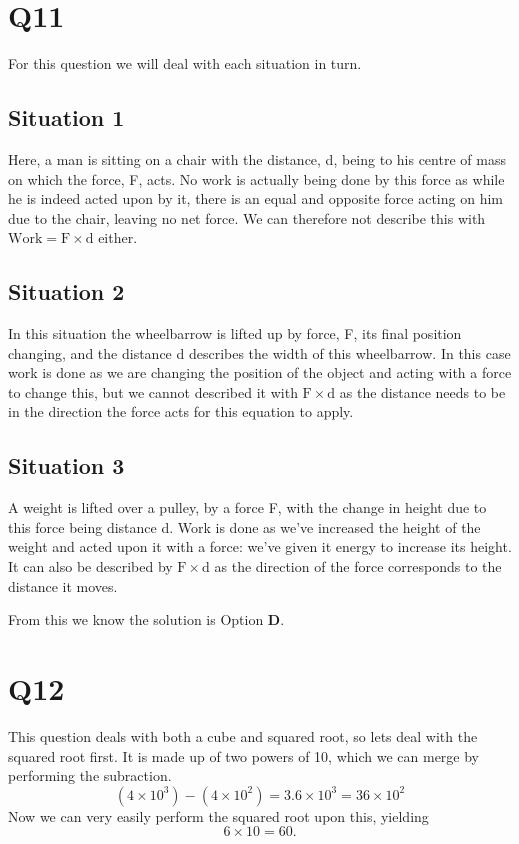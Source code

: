 \documentclass[11pt]{article}
\begin{document}
\section*{Q11}
For this question we will deal with each situation in turn.

\subsection*{Situation 1}
Here, a man is sitting on a chair with the distance, d, being to his centre of mass on which the force, F, acts.  No work is actually being done by this force as while he is indeed acted upon by it, there is an equal and opposite force acting on him due to the chair, leaving no net force.  We can therefore not describe this with $\mathrm{Work= F \times d}$ either.

\subsection*{Situation 2}
In this situation the wheelbarrow is lifted up by force, F, its final position changing, and the distance d describes the width of this wheelbarrow.  In this case work is done as we are changing the position of the object and acting with a force to change this, but we cannot described it with $\mathrm{F\times d}$ as the distance needs to be in the direction the force acts for this equation to apply.

\subsection*{Situation 3}
A weight is lifted over a pulley, by a force F, with the change in height due to this force being distance d.  Work is done as we've increased the height of the weight and acted upon it with a force: we've given it energy to increase its height.  It can also be described by $\mathrm{F\times d}$ as the direction of the force corresponds to the distance it moves.

From this we know the solution is Option \textbf{D}.

\section*{Q12}
This question deals with both a cube and squared root, so lets deal with the squared root first.  It is made up of two powers of 10, which we can merge by performing the subraction.
\begin{equation*}
(4\times10^3) - (4\times10^2) = 3.6\times10^3 = 36 \times 10^2
\end{equation*}
Now we can very easily perform the squared root upon this, yielding
\begin{equation*}
6\times 10 = 60.
\end{equation*}
\end{document}
